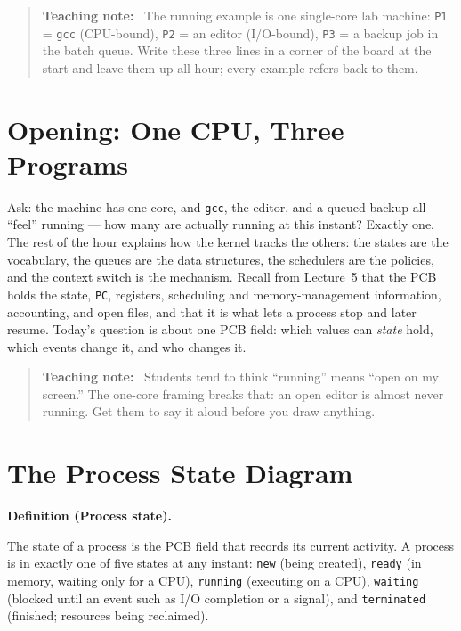 \documentclass[11pt]{article}
\newenvironment{definitionbox}[1]{%
  \par\noindent\textbf{Definition (#1).}\ \itshape
}{\par\vspace{0.3em}}
\newenvironment{teachingaside}{\begin{quote}\small\color{primary-gold}\textbf{Teaching note:}\ }{\end{quote}}
\begin{document}
\begin{teachingaside}
The running example is one single-core lab machine: \texttt{P1} = \texttt{gcc} (CPU-bound), \texttt{P2} = an editor (I/O-bound), \texttt{P3} = a backup job in the batch queue. Write these three lines in a corner of the board at the start and leave them up all hour; every example refers back to them.
\end{teachingaside}

\section{Opening: One CPU, Three Programs}

Ask: the machine has one core, and \texttt{gcc}, the editor, and a queued backup all ``feel'' running --- how many are actually running at this instant? Exactly one. The rest of the hour explains how the kernel tracks the others: the states are the vocabulary, the queues are the data structures, the schedulers are the policies, and the context switch is the mechanism. Recall from Lecture~5 that the PCB holds the state, \texttt{PC}, registers, scheduling and memory-management information, accounting, and open files, and that it is what lets a process stop and later resume. Today's question is about one PCB field: which values can \emph{state} hold, which events change it, and who changes it.

\begin{teachingaside}
Students tend to think ``running'' means ``open on my screen.'' The one-core framing breaks that: an open editor is almost never running. Get them to say it aloud before you draw anything.
\end{teachingaside}

\section{The Process State Diagram}

\begin{definitionbox}{Process state}
The state of a process is the PCB field that records its current activity. A process is in exactly one of five states at any instant: \texttt{new} (being created), \texttt{ready} (in memory, waiting only for a CPU), \texttt{running} (executing on a CPU), \texttt{waiting} (blocked until an event such as I/O completion or a signal), and \texttt{terminated} (finished; resources being reclaimed).
\end{definitionbox}
\end{document}
